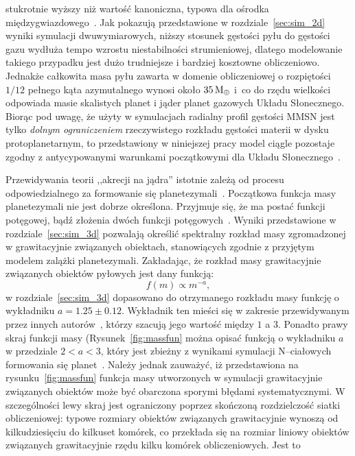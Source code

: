 stukrotnie wyższy niż wartość kanoniczna, typowa dla ośrodka
międzygwiazdowego~\cite{FS03}. Jak pokazują przedstawione w rozdziale~\ref{sec:sim_2d}
wyniki symulacji dwuwymiarowych, niższy stosunek gęstości pyłu do gęstości gazu
wydłuża tempo wzrostu niestabilności strumieniowej, dlatego modelowanie
takiego przypadku jest  dużo trudniejsze i bardziej kosztowne
obliczeniowo.  Jednakże całkowita masa pyłu zawarta w domenie obliczeniowej o
rozpiętości $1/12$ pełnego kąta azymutalnego wynosi około $35\hbox{$\mathrm{\thinspace M_{\oplus}}$}$ i~co do rzędu
wielkości odpowiada masie skalistych planet i jąder planet gazowych Układu
Słonecznego. Biorąc pod uwagę, że użyty w symulacjach radialny profil gęstości
MMSN jest tylko \emph{dolnym ograniczeniem} rzeczywistego rozkładu gęstości
materii w dysku protoplanetarnym, to przedstawiony w niniejszej pracy model
ciągle pozostaje zgodny z antycypowanymi warunkami początkowymi dla Układu
Słonecznego~\cite{D07}.
\par Przewidywania teorii ,,akrecji na jądra'' istotnie zależą od procesu
odpowiedzialnego za formowanie się planetezymali~\cite{HBP13}. Początkowa
funkcja masy planetezymali nie jest dobrze określona. Przyjmuje się, że ma
postać funkcji potęgowej, bądź złożenia dwóch funkcji potęgowych~\cite{R03}.
Wyniki przedstawione w rozdziale~\ref{sec:sim_3d} pozwalają określić spektralny
rozkład masy zgromadzonej w grawitacyjnie związanych obiektach, stanowiących
zgodnie z przyjętym modelem zalążki planetezymali.  Zakładając, że rozkład masy
grawitacyjnie związanych obiektów pyłowych jest dany funkcją:
%
\begin{equation}
   f(m) \propto m^{-a},
\end{equation}
%
w rozdziale~\ref{sec:sim_3d} dopasowano do otrzymanego rozkładu masy funkcję o
wykładniku $a = 1.25\pm0.12$. Wykładnik ten mieści się w zakresie przewidywanym
przez innych
autorów~\cite{R03}, którzy szacują jego wartość między $1$ a $3$. Ponadto prawy
skraj funkcji masy (Rysunek~\ref{fig:massfun} można opisać funkcją o wykładniku
$a$ w przedziale $2 < a < 3$, który jest zbieżny z wynikami symulacji N--ciałowych
formowania się planet~\cite{MFFK98}.  Należy jednak zauważyć, iż przedstawiona
na rysunku~\ref{fig:massfun} funkcja masy utworzonych w symulacji grawitacyjnie
związanych obiektów może być obarczona sporymi błędami systematycznymi.
W szczególności lewy skraj jest ograniczony poprzez skończoną rozdzielczość
siatki obliczeniowej: typowe rozmiary obiektów związanych grawitacyjnie wynoszą
od kilkudziesięciu do kilkuset komórek, co przekłada się na rozmiar liniowy
obiektów związanych grawitacyjnie rzędu kilku komórek obliczeniowych. Jest to
